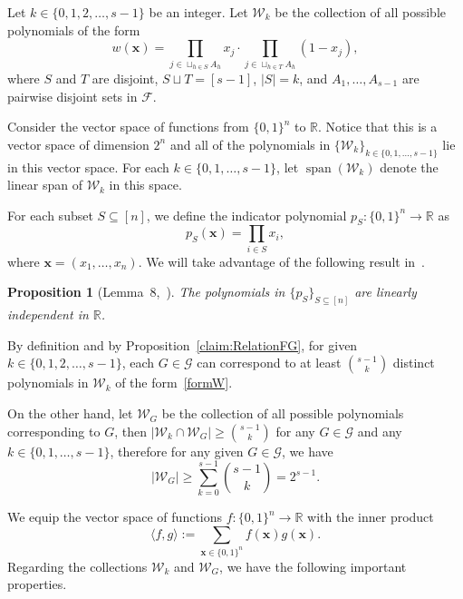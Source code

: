 \documentclass[11pt]{article}
\newtheorem{prop}[theorem]{Proposition}
\theoremstyle{definition}
\begin{document}
Let \(k\in\{0,1,2,\ldots,s-1\}\) be an integer. Let \(\mathcal{W}_{k}\) be the collection of all possible polynomials of the form
\begin{equation}\label{formW}
    w(\bm{x})=\prod\limits_{j\in\sqcup_{h\in S}A_{h}}x_{j}\cdot \prod\limits_{j\in\sqcup_{h\in T}A_{h}}(1-x_{j}),
\end{equation}
where \(S\) and \(T\) are disjoint, \(S\sqcup T=[s-1]\), \(|S|=k\), and $A_1,\ldots,A_{s-1}$ are pairwise disjoint sets in $\mathcal{F}$.

Consider the vector space of functions from \(\{0,1\}^{n}\) to \(\mathbb{R}\). Notice that this is a vector space of dimension \(2^{n}\) and all of the polynomials in \(\{\mathcal{W}_{k}\}_{k\in\{0,1,\ldots,s-1\}}\) lie in this vector space. For each \(k\in\{0,1,\ldots,s-1\}\), let
\(
\operatorname{span}(\mathcal{W}_{k})
\)
denote the linear span of \(\mathcal{W}_{k}\) in this space.

For each subset \(S\subseteq [n]\), we define the indicator polynomial \(p_{S}:\{0,1\}^{n}\rightarrow \mathbb{R}\) as
\[
p_{S}(\bm{x})=\prod_{i\in S}x_{i},
\]
where \(\bm{x}=(x_{1},\ldots,x_{n})\). We will take advantage of the following result in~\cite{2018BLMS}.
\begin{prop}[Lemma~8,~\cite{2018BLMS}]\label{prop:linearly independent of p_s}
    The polynomials in \(\{p_{S}\}_{S\subseteq [n]}\) are linearly independent in \(\mathbb{R}\).
\end{prop}



By definition and by Proposition~\ref{claim:RelationFG}, for given \(k\in\{0,1,2,\ldots,s-1\}\), each \(G\in\mathcal{G}\) can correspond to at least \(\binom{s-1}{k}\) distinct polynomials in \(\mathcal{W}_{k}\) of the form~\eqref{formW}.

On the other hand, let \(\mathcal{W}_{G}\) be the collection of all possible polynomials corresponding to \(G\), then \(|\mathcal{W}_{k}\cap\mathcal{W}_{G}|\ge\binom{s-1}{k}\) for any \(G\in\mathcal{G}\) and any \(k\in\{0,1,\ldots,s-1\}\), therefore for any given \(G\in\mathcal{G}\), we have
\[
|\mathcal{W}_{G}|\ge \sum\limits_{k=0}^{s-1}\binom{s-1}{k}=2^{s-1}.
\]

We equip the vector space of functions \(f:\{0,1\}^n\to\mathbb R\) with the inner product
\[
\langle f,g\rangle := \sum_{\bm{x}\in\{0,1\}^n} f(\bm{x})g(\bm{x}).
\]
Regarding the collections \(\mathcal{W}_{k}\) and \(\mathcal{W}_{G}\), we have the following important properties.
\end{document}

